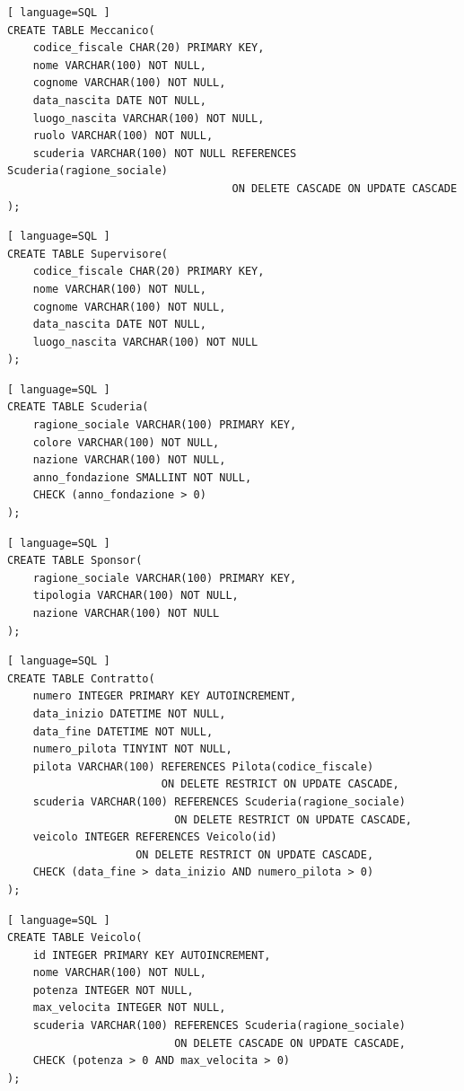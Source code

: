 \documentclass[11pt]{article}
\begin{document}
\begin{lstlisting}[ language=SQL ]
CREATE TABLE Meccanico(
    codice_fiscale CHAR(20) PRIMARY KEY,
    nome VARCHAR(100) NOT NULL,
    cognome VARCHAR(100) NOT NULL,
    data_nascita DATE NOT NULL,
    luogo_nascita VARCHAR(100) NOT NULL,
    ruolo VARCHAR(100) NOT NULL,
    scuderia VARCHAR(100) NOT NULL REFERENCES Scuderia(ragione_sociale) 
                                   ON DELETE CASCADE ON UPDATE CASCADE
);
\end{lstlisting}

\begin{lstlisting}[ language=SQL ]
CREATE TABLE Supervisore(
    codice_fiscale CHAR(20) PRIMARY KEY,
    nome VARCHAR(100) NOT NULL,
    cognome VARCHAR(100) NOT NULL,
    data_nascita DATE NOT NULL,
    luogo_nascita VARCHAR(100) NOT NULL
);
\end{lstlisting}

\begin{lstlisting}[ language=SQL ]
CREATE TABLE Scuderia(
    ragione_sociale VARCHAR(100) PRIMARY KEY,
    colore VARCHAR(100) NOT NULL,
    nazione VARCHAR(100) NOT NULL,
    anno_fondazione SMALLINT NOT NULL,
    CHECK (anno_fondazione > 0)
);
\end{lstlisting}

\begin{lstlisting}[ language=SQL ]
CREATE TABLE Sponsor(
    ragione_sociale VARCHAR(100) PRIMARY KEY,
    tipologia VARCHAR(100) NOT NULL,
    nazione VARCHAR(100) NOT NULL
);
\end{lstlisting}

\begin{lstlisting}[ language=SQL ]
CREATE TABLE Contratto(
    numero INTEGER PRIMARY KEY AUTOINCREMENT,
    data_inizio DATETIME NOT NULL,
    data_fine DATETIME NOT NULL,
    numero_pilota TINYINT NOT NULL,
    pilota VARCHAR(100) REFERENCES Pilota(codice_fiscale) 
                        ON DELETE RESTRICT ON UPDATE CASCADE,
    scuderia VARCHAR(100) REFERENCES Scuderia(ragione_sociale) 
                          ON DELETE RESTRICT ON UPDATE CASCADE,
    veicolo INTEGER REFERENCES Veicolo(id) 
                    ON DELETE RESTRICT ON UPDATE CASCADE,
    CHECK (data_fine > data_inizio AND numero_pilota > 0)
);
\end{lstlisting}

\begin{lstlisting}[ language=SQL ]
CREATE TABLE Veicolo(
    id INTEGER PRIMARY KEY AUTOINCREMENT,
    nome VARCHAR(100) NOT NULL,
    potenza INTEGER NOT NULL,
    max_velocita INTEGER NOT NULL,
    scuderia VARCHAR(100) REFERENCES Scuderia(ragione_sociale) 
                          ON DELETE CASCADE ON UPDATE CASCADE,
    CHECK (potenza > 0 AND max_velocita > 0)
);
\end{lstlisting}
\end{document}
